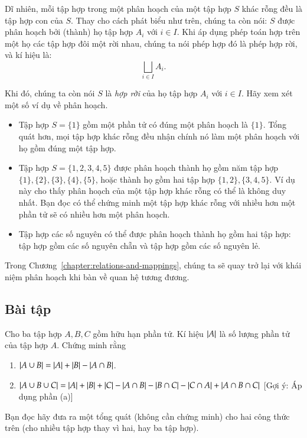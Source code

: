 Dĩ nhiên, mỗi tập hợp trong một phân hoạch của một tập hợp $S$ khác rỗng đều là tập hợp con của $S$. Thay cho cách phát biểu như trên, chúng ta còn nói: $S$ được phân hoạch bởi (thành) họ tập hợp $A_{i}$ với $i\in I$. Khi áp dụng phép toán hợp trên một họ các tập hợp đôi một rời nhau, chúng ta nói phép hợp đó là phép hợp rời, và kí hiệu là:
\[
    \bigsqcup_{i\in I}A_{i}.
\]

Khi đó, chúng ta còn nói $S$ là \textit{hợp rời} của họ tập hợp $A_{i}$ với $i\in I$. Hãy xem xét một số ví dụ về phân hoạch.
\begin{itemize}
    \item Tập hợp $S = \{ 1 \}$ gồm một phần tử có đúng một phân hoạch là $\{ 1 \}$. Tổng quát hơn, mọi tập hợp khác rỗng đều nhận chính nó làm một phân hoạch với họ gồm đúng một tập hợp.
    \item Tập hợp $S = \{ 1, 2, 3, 4, 5 \}$ được phân hoạch thành họ gồm năm tập hợp $\{ 1 \}, \{ 2 \}, \{ 3 \}, \{ 4 \}, \{ 5 \}$, hoặc thành họ gồm hai tập hợp $\{ 1, 2 \}, \{ 3, 4, 5 \}$. Ví dụ này cho thấy phân hoạch của một tập hợp khác rỗng có thể là không duy nhất. Bạn đọc có thể chứng minh một tập hợp khác rỗng với nhiều hơn một phần tử sẽ có nhiều hơn một phân hoạch.
    \item Tập hợp các số nguyên có thể được phân hoạch thành họ gồm hai tập hợp: tập hợp gồm các số nguyên chẵn và tập hợp gồm các số nguyên lẻ.
\end{itemize}

Trong Chương~\ref{chapter:relations-and-mappings}, chúng ta sẽ quay trở lại với khái niệm phân hoạch khi bàn về quan hệ tương đương.

\subsection*{Bài tập}
\setcounter{exercise}{0}

\begin{exercise}\label{set-operations:exercise1}
    Cho ba tập hợp $A, B, C$ gồm hữu hạn phần tử. Kí hiệu $\left\vert{A}\right\vert$ là số lượng phần tử của tập hợp $A$. Chứng minh rằng
    \begin{enumerate}[label={(\alph*)}]
        \item $\left\vert{A\cup B}\right\vert = \left\vert{A}\right\vert + \left\vert{B}\right\vert - \left\vert{A\cap B}\right\vert$.
        \item $\left\vert{A\cup B\cup C}\right\vert = \left\vert{A}\right\vert + \left\vert{B}\right\vert + \left\vert{C}\right\vert - \left\vert{A\cap B}\right\vert - \left\vert{B\cap C}\right\vert - \left\vert{C\cap A}\right\vert + \left\vert{A\cap B\cap C}\right\vert$ [Gợi ý: Áp dụng phần (a)]
    \end{enumerate}

    Bạn đọc hãy đưa ra một tổng quát (không cần chứng minh) cho hai công thức trên (cho nhiều tập hợp thay vì hai, hay ba tập hợp).
\end{exercise}

